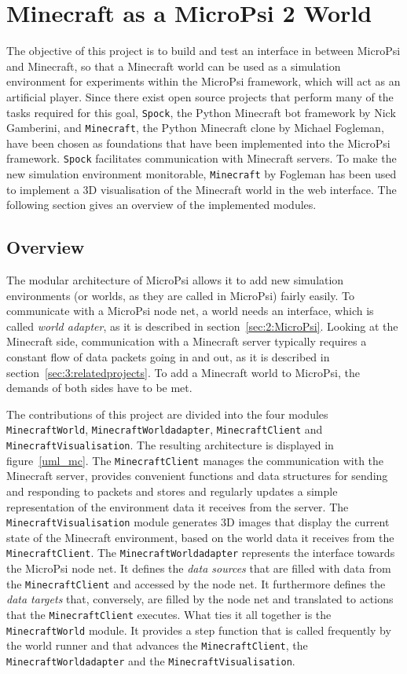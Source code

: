 \chapter{Minecraft as a MicroPsi 2 World}
\label{chap:4}
The objective of this project is to build and test an interface in between MicroPsi and Minecraft, so that a Minecraft world can be used as a simulation environment for experiments within the MicroPsi framework, which will act as an artificial player. Since there exist open source projects that perform many of the tasks required for this goal, \texttt{Spock}, the Python Minecraft bot framework by Nick Gamberini, and \texttt{Minecraft}, the Python Minecraft clone by Michael Fogleman, have been chosen as foundations that have been implemented into the MicroPsi framework. \texttt{Spock} facilitates communication with Minecraft servers. To make the new simulation environment monitorable, \texttt{Minecraft} by Fogleman has been used to implement a 3D visualisation of the Minecraft world in the web interface. The following section gives an overview of the implemented modules.

\section{Overview}

The modular architecture of MicroPsi allows it to add new simulation environments (or worlds, as they are called in MicroPsi) fairly easily. To communicate with a MicroPsi node net, a world needs an interface, which is called \emph{world adapter}, as it is described in section~\ref{sec:2:MicroPsi}. Looking at the Minecraft side, communication with a Minecraft server typically requires a constant flow of data packets going in and out, as it is described in section~\ref{sec:3:relatedprojects}. To add a Minecraft world to MicroPsi, the demands of both sides have to be met.

The contributions of this project are divided into the four modules \texttt{MinecraftWorld}, \texttt{MinecraftWorldadapter}, \texttt{MinecraftClient} and \texttt{MinecraftVisualisation}. The resulting architecture is displayed in figure~\ref{uml_mc}. The \texttt{MinecraftClient} manages the communication with the Minecraft server, provides convenient functions and data structures for sending and responding to packets and stores and regularly updates a simple representation of the environment data it receives from the server. The \texttt{MinecraftVisualisation} module generates 3D images that display the current state of the Minecraft environment, based on the world data it receives from the \texttt{MinecraftClient}. The \texttt{MinecraftWorldadapter} represents the interface towards the MicroPsi node net. It defines the \emph{data sources} that are filled with data from the \texttt{MinecraftClient} and accessed by the node net. It furthermore defines the \emph{data targets} that, conversely, are filled by the node net and translated to actions that the \texttt{MinecraftClient} executes. What ties it all together is the \texttt{MinecraftWorld} module. It provides a step function that is called frequently by the world runner and that advances the \texttt{MinecraftClient}, the \texttt{MinecraftWorldadapter} and the \texttt{MinecraftVisualisation}.

